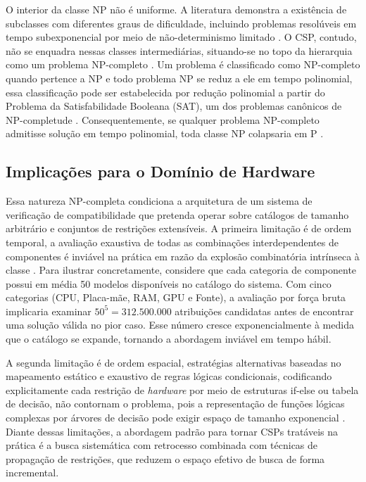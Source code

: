 O interior da classe NP não é uniforme. A literatura demonstra a existência de subclasses com diferentes
graus de dificuldade, incluindo problemas resolúveis em tempo subexponencial por meio de não-determinismo limitado \cite{Papadimitriou1996}.
O CSP, contudo, não se enquadra nessas classes intermediárias, situando-se no topo da hierarquia como um problema NP-completo \cite{Sipser2012}.
Um problema é classificado como NP-completo quando pertence a NP e todo problema NP se reduz
a ele em tempo polinomial, essa classificação pode ser estabelecida por redução polinomial a partir
do Problema da Satisfabilidade Booleana (SAT), um dos problemas canônicos de NP-completude \cite{Cormen2001,Sipser2012}.
Consequentemente, se qualquer problema NP-completo admitisse solução em tempo polinomial,
toda classe NP colapsaria em P \cite{Sipser2012}.

\subsection{Implicações para o Domínio de Hardware}
Essa natureza NP-completa condiciona a arquitetura de um sistema de verificação de compatibilidade que pretenda operar sobre catálogos de tamanho arbitrário e conjuntos de restrições extensíveis. A primeira limitação é de ordem temporal,
a avaliação exaustiva de todas as combinações interdependentes de componentes é inviável na prática em razão
da explosão combinatória intrínseca à classe \cite{Sipser2012,Cormen2001}. Para ilustrar concretamente, considere
que cada categoria de componente possui em média 50 modelos disponíveis no catálogo do sistema. Com cinco
categorias (CPU, Placa-mãe, RAM, GPU e Fonte), a avaliação por força bruta implicaria examinar $50^5 = 312.500.000$ atribuições
candidatas antes de encontrar uma solução válida no pior caso. Esse número cresce exponencialmente à medida
que o catálogo se expande, tornando a abordagem inviável em tempo hábil.

A segunda limitação é de ordem espacial, estratégias alternativas baseadas no mapeamento
estático e exaustivo de regras lógicas condicionais, codificando explicitamente cada restrição de \textit{hardware}
por meio de estruturas if-else ou tabela de decisão, não contornam o problema, pois a representação de funções
lógicas complexas por árvores de decisão pode exigir espaço de tamanho exponencial \cite{Jukna1999}. Diante
dessas limitações, a abordagem padrão para tornar CSPs tratáveis na prática é a busca sistemática
com retrocesso combinada com técnicas de propagação de restrições, que reduzem o espaço efetivo
de busca de forma incremental.

